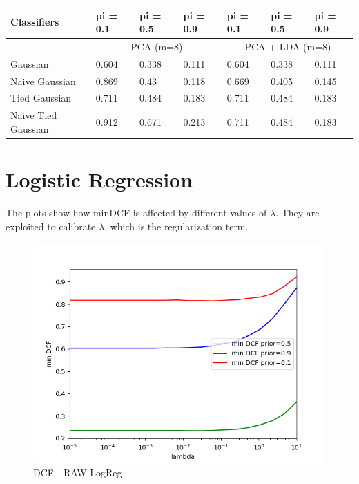 \documentclass[italian]{report}
\begin{document}
\begin{table}[h!]
    \centering
    \begin{tabular}{@{}lllllll@{}}
    \hline
    Classifiers         & pi = 0.1 & pi = 0.5 & pi = 0.9 & pi = 0.1   & pi = 0.5   & pi = 0.9  \\ \hline
                            & \multicolumn{3}{c}{PCA (m=8)}  & \multicolumn{3}{c}{PCA + LDA (m=8)} \\
    Gaussian            & 0.604    & 0.338    & 0.111    & 0.604      & 0.338      & 0.111     \\
    Naive Gaussian      & 0.869     & 0.43    & 0.118    & 0.669      & 0.405      & 0.145     \\
    Tied Gaussian       & 0.711    & 0.484    & 0.183    & 0.711      & 0.484      & 0.183     \\
    Naive Tied Gaussian & 0.912    & 0.671    & 0.213    & 0.711      & 0.484      & 0.183     \\ \hline
    \end{tabular}\label{tab:table3}
\end{table}

\newpage

\section{Logistic Regression}
The plots show how minDCF is affected by different values of $\lambda$.  They are exploited to calibrate
$\lambda$, which is the regularization term.

\begin{figure}[h!]
    \centering
    \includegraphics[scale=0.5]{../../images/DCF_LR, LR_minDCF_comparison.png}
    \caption{DCF - RAW LogReg}
    \label{DCF - RAW LogReg}
\end{figure}
\end{document}
